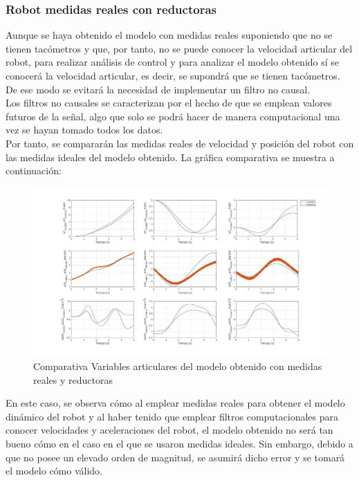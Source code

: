 \subsubsection{Robot medidas reales con reductoras}

Aunque se haya obtenido el modelo con medidas reales suponiendo que no se tienen tacómetros y que, por tanto, no se puede conocer la velocidad articular del robot, para realizar análisis de control y para analizar el modelo obtenido sí se conocerá la velocidad articular, es decir, se supondrá que se tienen tacómetros. De ese modo se evitará la necesidad de implementar un filtro no causal. \\

Los filtros no causales se caracterizan por el hecho de que se emplean valores futuros de la señal, algo que solo se podrá hacer de manera computacional una vez se hayan tomado todos los datos.\\



Por tanto, se compararán las medidas reales de velocidad y posición del robot con las medidas ideales del modelo obtenido. La gráfica comparativa se muestra a continuación:



\begin{figure}[h!]
	
	\centering
	
	\includegraphics[width=1\textwidth]{EstimacParam_SisMod_In1_RealCR}
	
	\caption{Comparativa Variables articulares del modelo obtenido con medidas reales y reductoras}
	
\end{figure}



En este caso, se observa cómo al emplear medidas reales para obtener el modelo dinámico del robot y al haber tenido que emplear filtros computacionales para conocer velocidades y aceleraciones del robot, el modelo obtenido no será tan bueno cómo en el caso en el que se usaron medidas ideales. Sin embargo, debido a que no posee un elevado orden de magnitud, se asumirá dicho error y se tomará el modelo cómo válido.\\

